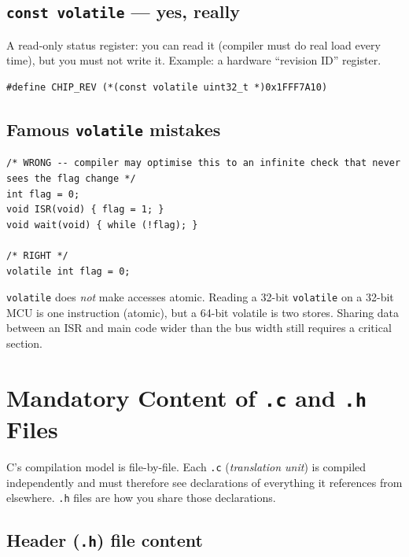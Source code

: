 \documentclass[11pt,a4paper]{article}
\begin{document}
\subsection{\texttt{const volatile} --- yes, really}

A read-only status register: you can read it (compiler must do real load
every time), but you must not write it. Example: a hardware ``revision ID''
register.
\begin{lstlisting}[style=C]
#define CHIP_REV (*(const volatile uint32_t *)0x1FFF7A10)
\end{lstlisting}

\subsection{Famous \texttt{volatile} mistakes}

\begin{lstlisting}[style=C]
/* WRONG -- compiler may optimise this to an infinite check that never sees the flag change */
int flag = 0;
void ISR(void) { flag = 1; }
void wait(void) { while (!flag); }

/* RIGHT */
volatile int flag = 0;
\end{lstlisting}

\begin{warning}
\texttt{volatile} does \emph{not} make accesses atomic. Reading a 32-bit
\texttt{volatile} on a 32-bit MCU is one instruction (atomic), but a 64-bit
volatile is two stores. Sharing data between an ISR and main code wider
than the bus width still requires a critical section.
\end{warning}

\section{Mandatory Content of \texttt{.c} and \texttt{.h} Files}

C's compilation model is file-by-file. Each \texttt{.c} (\emph{translation
unit}) is compiled independently and must therefore see declarations of
everything it references from elsewhere. \texttt{.h} files are how you share
those declarations.

\subsection{Header (\texttt{.h}) file content}
\end{document}
